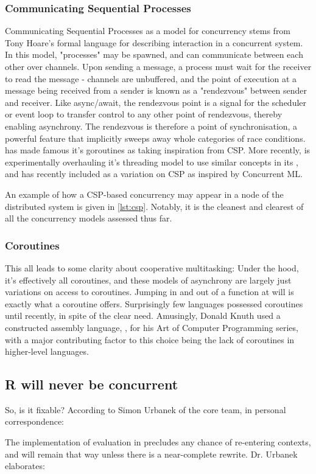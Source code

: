 \subsubsection{Communicating Sequential Processes}

Communicating Sequential Processes as a model for concurrency stems from Tony Hoare's formal language for describing interaction in a concurrent system\cite{hoare1978communicating}.
In this model, "processes" may be spawned, and can communicate between each other over channels.
Upon sending a message, a process must wait for the receiver to read the message - channels are unbuffered, and the point of execution at a message being received from a sender is known as a "rendezvous" between sender and receiver.
Like async/await, the rendezvous point is a signal for the scheduler or event loop to transfer control to any other point of rendezvous, thereby enabling asynchrony.
The rendezvous is therefore a point of synchronisation, a powerful feature that implicitly sweeps away whole categories of race conditions.
 has made famous it's goroutines as taking inspiration from CSP\cite{gomem2014}.
More recently,  is experimentally overhauling it's threading model to use similar concepts in its , and  has recently included  as a variation on CSP as inspired by Concurrent ML.

An example of how a CSP-based concurrency may appear in a node of the distributed system is given in \cref{lst:csp}.
Notably, it is the cleanest and clearest of all the concurrency models assessed thus far.


\subsubsection{Coroutines}

This all leads to some clarity about cooperative multitasking: Under the hood, it's effectively all coroutines, and these models of asynchrony are largely just variations on access to coroutines.
Jumping in and out of a function at will is exactly what a coroutine offers.
Surprisingly few languages possessed coroutines until recently, in spite of the clear need.
Amusingly, Donald Knuth used a constructed assembly language, , for his Art of Computer Programming series, with a major contributing factor to this choice being the lack of coroutines in higher-level languages\cite{knuth1}.

\subsection{R will never be concurrent}\label{sec:no}

So, is it fixable?
According to Simon Urbanek of the \R{} core team, in personal correspondence:


The implementation of evaluation in \R{} precludes any chance of re-entering contexts, and will remain that way unless there is a near-complete rewrite. Dr. Urbanek elaborates:

